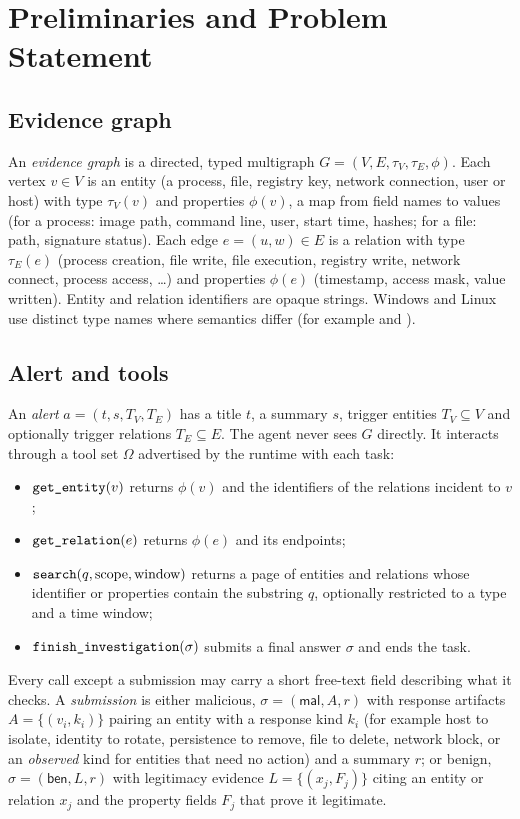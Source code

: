 \section{Preliminaries and Problem Statement}
\label{sec:problem}

\subsection{Evidence graph}
An \emph{evidence graph} is a directed, typed multigraph $G=(V,E,\tau_V,\tau_E,\phi)$. Each vertex $v\in V$
is an entity (a process, file, registry key, network connection, user or host) with type
$\tau_V(v)$ and properties $\phi(v)$, a map from field names to values (for a process: image path, command line,
user, start time, hashes; for a file: path, signature status). Each edge $e=(u,w)\in E$ is a relation with type
$\tau_E(e)$ (process creation, file write, file execution, registry write, network connect, process access,
\dots) and properties $\phi(e)$ (timestamp, access mask, value written). Entity and relation identifiers are
opaque strings. Windows and Linux use distinct type names where semantics differ (for example
 and ).

\subsection{Alert and tools}
An \emph{alert} $a=(t, s, T_V, T_E)$ has a title $t$, a summary $s$, trigger entities $T_V\subseteq V$ and
optionally trigger relations $T_E\subseteq E$. The agent never sees $G$ directly. It interacts through a
tool set $\Omega$ advertised by the runtime with each task:
\begin{itemize}
\item $\texttt{get\_entity}(v)$ returns $\phi(v)$ and the identifiers of the relations incident to $v$;
\item $\texttt{get\_relation}(e)$ returns $\phi(e)$ and its endpoints;
\item $\texttt{search}(q,\text{scope},\text{window})$ returns a page of entities and relations whose
identifier or properties contain the substring $q$, optionally restricted to a type and a time window;
\item $\texttt{finish\_investigation}(\sigma)$ submits a final answer $\sigma$ and ends the task.
\end{itemize}
Every call except a submission may carry a short free-text field describing what it checks. A
\emph{submission} is either malicious, $\sigma=(\textsf{mal}, A, r)$ with response artifacts
$A=\{(v_i,k_i)\}$ pairing an entity with a response kind $k_i$ (for example host to isolate, identity to
rotate, persistence to remove, file to delete, network block, or an \emph{observed} kind for entities that
need no action) and a summary $r$; or benign, $\sigma=(\textsf{ben}, L, r)$ with legitimacy evidence
$L=\{(x_j,F_j)\}$ citing an entity or relation $x_j$ and the property fields $F_j$ that prove it legitimate.

